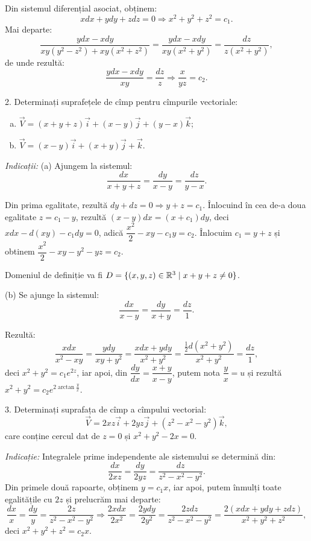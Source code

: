 Din sistemul diferențial asociat, obținem:
\[
  xdx + ydy + zdz = 0 \Rightarrow x^2 + y^2 + z^2 = c_1.
\]
Mai departe:
\[
  \dfrac{ydx - xdy}{xy(y^2 - z^2) + xy(x^2 + z^2)} = %
  \dfrac{ydx - xdy}{xy(x^2 + y^2)} = \dfrac{dz}{z(x^2 + y^2)},
\]
de unde rezultă:
\[
  \dfrac{ydx - xdy}{xy} = \dfrac{dz}{z} \Rightarrow \dfrac{x}{yz} = c_2.
\]

\vspace{1cm}

2. Determinați suprafețele de cîmp pentru cîmpurile vectoriale:
\begin{enumerate}[(a)]
\item $ \vec{V} = (x + y + z)\vec{i} + (x - y)\vec{j} + (y - x)\vec{k} $;
\item $ \vec{V} = (x - y)\vec{i} + (x + y) \vec{j} + \vec{k} $.
\end{enumerate}

\emph{Indicații:} (a) Ajungem la sistemul:
\[
  \dfrac{dx}{x + y + z} = \dfrac{dy}{x - y} = \dfrac{dz}{y - x}.
\]

Din prima egalitate, rezultă $ dy + dz = 0 \Rightarrow y + z = c_1 $. Înlocuind
în cea de-a doua egalitate $ z = c_1 - y $, rezultă $ (x - y)dx = (x + c_1)dy $,
deci $ xdx - d(xy) - c_1 dy = 0 $, adică $ \dfrac{x^2}{2} - xy - c_1y = c_2 $. Înlocuim
$ c_1 = y + z $ și obtinem $ \dfrac{x^2}{2} - xy - y^2 - yz = c_2 $.

Domeniul de definiție va fi $ D = \{ (x, y, z) \in \mathbb{R}^3 \mid x + y + z \neq 0 \} $.

(b) Se ajunge la sistemul:
\[
  \dfrac{dx}{x - y} = \dfrac{dy}{x + y} = \dfrac{dz}{1}.
\]

Rezultă:
\[
  \dfrac{xdx}{x^2 - xy} = \dfrac{ydy}{xy + y^2} = \dfrac{xdx + ydy}{x^2 + y^2} = %
  \dfrac{\frac{1}{2} d(x^2 + y^2)}{x^2 + y^2} = \dfrac{dz}{1},
\]
deci $ x^2 + y^2 = c_1 e^{2z} $, iar apoi, din $ \dfrac{dy}{dx} = \dfrac{x + y}{x - y} $,
putem nota $ \dfrac{y}{x} = u $ și rezultă $ x^2 + y^2 = c_2 e^{2 \arctan \frac{y}{x}} $.

\vspace{1cm}

3. Determinați suprafața de cîmp a cîmpului vectorial:
\[
  \vec{V} = 2xz\vec{i} + 2yz\vec{j} + (z^2 - x^2 - y^2)\vec{k},
\]
care conține cercul dat de $ z = 0 $ și $ x^2 + y^2 - 2x = 0 $.

\emph{Indicație:} Integralele prime independente ale sistemului se
determină din:
\[
  \dfrac{dx}{2xz} = \dfrac{dy}{2yz} = \dfrac{dz}{z^2 - x^2 - y^2}.
\]
Din primele două rapoarte, obținem $ y = c_1 x $, iar apoi, putem înmulți
toate egalitățile cu $ 2z $ și prelucrăm mai departe:
\[
  \dfrac{dx}{x} = \dfrac{dy}{y} = \dfrac{2z}{z^2 - x^2 - y^2} \Rightarrow %
  \dfrac{2xdx}{2x^2} = \dfrac{2ydy}{2y^2} = \dfrac{2zdz}{z^2 - x^2 - y^2} = %
  \dfrac{2(xdx + ydy + zdz)}{x^2 + y^2 + z^2},
\]
deci $ x^2 + y^2 + z^2 = c_2 x $.

